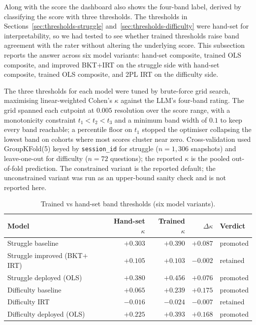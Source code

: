 Along with the score the dashboard also shows the four-band label, derived by classifying the score with three thresholds.
The thresholds in Sections~\ref{sec:thresholds-struggle} and~\ref{sec:thresholds-difficulty} were hand-set for interpretability, so we had tested to see whether trained thresholds raise band agreement with the rater without altering the underlying score. This subsection reports the answer across six model variants: hand-set composite, trained OLS composite, and improved BKT$+$IRT on the struggle side with hand-set composite, trained OLS composite, and 2PL IRT on the difficulty side.

The three thresholds for each model were tuned by brute-force grid search, maximising linear-weighted Cohen's $\kappa$ against the LLM's four-band rating. 
The grid spanned each cutpoint at $0.005$ resolution over the score range, with a monotonicity constraint $t_1 < t_2 < t_3$ and a minimum band width of $0.1$ to keep every band reachable; a percentile floor on $t_1$ stopped the optimiser collapsing the lowest band on cohorts where most scores cluster near zero. 
Cross-validation used GroupKFold(5) keyed by \texttt{session\_id} for struggle ($n = 1{,}306$ snapshots) and leave-one-out for difficulty ($n = 72$ questions); the reported $\kappa$ is the pooled out-of-fold prediction. The constrained variant is the reported default; the unconstrained variant was run as an upper-bound sanity check and is not reported here.

\begin{table}[H]
\centering
\caption{Trained vs hand-set band thresholds (six model variants).}
\label{tab:eval-thresholds}
\begin{tabular}{|l|r|r|r|l|}
\hline
\textbf{Model} & \textbf{Hand-set $\kappa$} & \textbf{Trained $\kappa$} & \textbf{$\Delta\kappa$} & \textbf{Verdict} \\
\hline
Struggle baseline & $+0.303$ & $+0.390$ & $+0.087$ & promoted \\
\hline
Struggle improved (BKT$+$IRT) & $+0.105$ & $+0.103$ & $-0.002$ & retained \\
\hline
Struggle deployed (OLS) & $+0.380$ & $+0.456$ & $+0.076$ & promoted \\
\hline
Difficulty baseline & $+0.065$ & $+0.239$ & $+0.175$ & promoted \\
\hline
Difficulty IRT & $-0.016$ & $-0.024$ & $-0.007$ & retained \\
\hline
Difficulty deployed (OLS) & $+0.225$ & $+0.393$ & $+0.168$ & promoted \\
\hline
\end{tabular}
\end{table}

